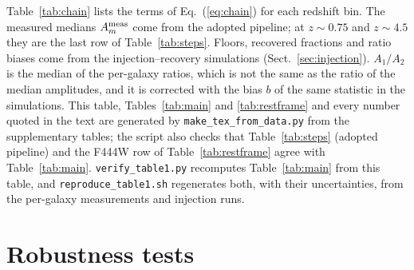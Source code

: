 \documentclass[fleqn,usenatbib]{mnras}
\begin{document}
Table~\ref{tab:chain} lists the terms of Eq.~(\ref{eq:chain}) for each
redshift bin. The measured medians $A_m^{\rm meas}$ come from the adopted
pipeline; at $z\sim0.75$ and $z\sim4.5$ they are the last row of
Table~\ref{tab:steps}. Floors, recovered fractions and ratio biases come from the
injection--recovery simulations (Sect.~\ref{sec:injection}). $A_1/A_2$ is the
median of the per-galaxy ratios, which is not the same as the ratio of the median
amplitudes, and it is corrected with the bias $b$ of the same statistic in the
simulations. This table, Tables~\ref{tab:main} and \ref{tab:restframe} and every
number quoted in the text are generated by \texttt{make\_tex\_from\_data.py} from
the supplementary tables; the script also checks that Table~\ref{tab:steps}
(adopted pipeline) and the F444W row of Table~\ref{tab:restframe} agree with
Table~\ref{tab:main}. \texttt{verify\_table1.py} recomputes Table~\ref{tab:main}
from this table, and \texttt{reproduce\_table1.sh} regenerates both, with their
uncertainties, from the per-galaxy measurements and injection runs.





\section{Robustness tests}\label{app:robust}
\end{document}
